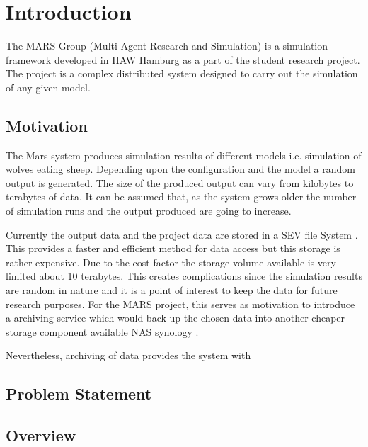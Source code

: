 \newpage
\chapter{Introduction}

The MARS Group (Multi Agent Research and Simulation) is a simulation framework developed 
in HAW Hamburg as a  part of the student research project. The project is a complex 
distributed system designed to carry  out the simulation of any given model. 
\cite{HAWHamburgMARS}
    \section{Motivation}
    The Mars system produces simulation results of different models i.e. simulation
    of wolves eating sheep. Depending upon the configuration and the model a random
    output is generated. The size of the produced output can vary from kilobytes to 
    terabytes of data. It can be assumed that, as the system grows older the number of 
    simulation runs and the output produced are going to increase.
    
    \par

    Currently the output data and the project data are stored in a
    SEV file System \cite{SEV}. This provides a faster and efficient method for data
    access but this storage is rather expensive. Due to the cost factor the storage 
    volume available is very limited about 10 terabytes. This creates complications
    since the simulation results are random in nature and it is a point of interest to
    keep the data for future research purposes. For the MARS project, this serves as 
    motivation to introduce a archiving service which would back up the chosen data
    into another cheaper storage component available NAS synology \cite{}. 

    \par

    Nevertheless, archiving of data provides the system with 
        
    \section{Problem Statement}
        

    \section{Overview}


